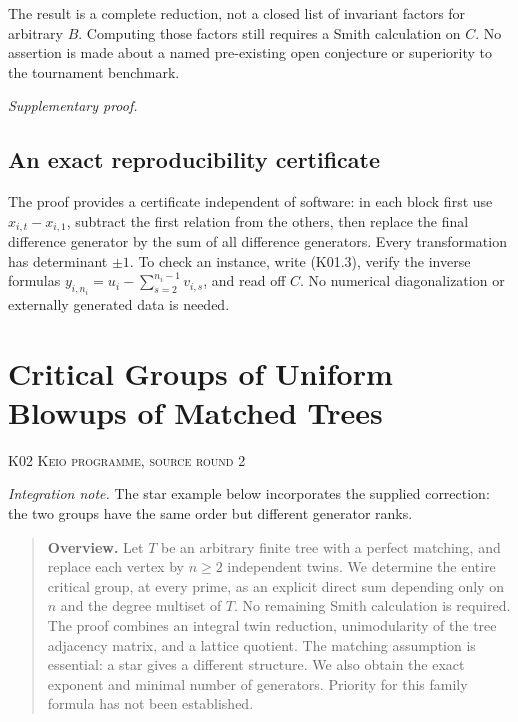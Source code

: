 \documentclass[11pt,a4paper]{article}
\theoremstyle{definition}\newtheorem{definition}[theorem]{Definition}
\theoremstyle{remark}\newtheorem{remark}[theorem]{Remark}
\numberwithin{equation}{section}
\begin{document}
The result is a complete reduction, not a closed list of invariant factors for arbitrary $B$. Computing those factors still requires a Smith calculation on $C$. No assertion is made about a named pre-existing open conjecture or superiority to the tournament benchmark.

\medskip\noindent\textit{Supplementary proof.}\par
\subsection{An exact reproducibility certificate}\label{K01-sec-6}
The proof provides a certificate independent of software: in each block first use $x_{i,t}-x_{i,1}$, subtract the first relation from the others, then replace the final difference generator by the sum of all difference generators. Every transformation has determinant $\pm1$. To check an instance, write (K01.3), verify the inverse formulas $y_{i,n_i}=u_i-\sum_{s=2}^{n_i-1}v_{i,s}$, and read off $C$. No numerical diagonalization or externally generated data is needed.





\clearpage
\section[K02 --- Critical Groups of Uniform Blowups of Matched Trees]{Critical Groups of Uniform Blowups of Matched Trees}\label{contrib-K02}
\noindent\textsc{K02 \quad Keio programme, source round 2}\par\medskip
\noindent\textit{Integration note.} The star example below incorporates the supplied correction: the two groups have the same order but different generator ranks.\par\medskip


\begin{quote}\small\textbf{Overview.} Let $T$ be an arbitrary finite tree with a perfect matching, and replace each vertex by $n\geq2$ independent twins. We determine the entire critical group, at every prime, as an explicit direct sum depending only on $n$ and the degree multiset of $T$. No remaining Smith calculation is required. The proof combines an integral twin reduction, unimodularity of the tree adjacency matrix, and a lattice quotient. The matching assumption is essential: a star gives a different structure. We also obtain the exact exponent and minimal number of generators. Priority for this family formula has not been established.\end{quote}
\end{document}
